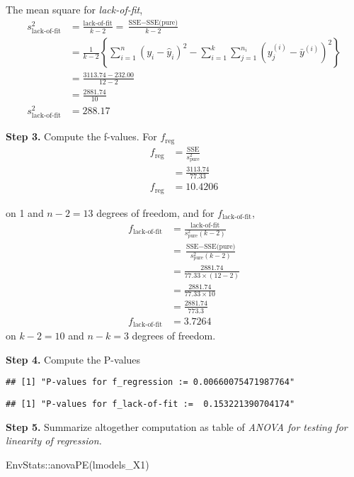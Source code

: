 \documentclass[
]{article}
\newenvironment{Shaded}{\begin{snugshade}}{\end{snugshade}}
\newcommand{\FunctionTok}[1]{\textcolor[rgb]{0.00,0.00,0.00}{#1}}
\newcommand{\NormalTok}[1]{#1}
\newcommand{\SpecialCharTok}[1]{\textcolor[rgb]{0.00,0.00,0.00}{#1}}
\begin{document}
The mean square for \emph{lack-of-fit}, \[
\begin{aligned}
s^2_{\text{lack-of-fit}} &= \frac{\text{lack-of-fit}}{k - 2}
= \frac{\text{SSE} - \text{SSE(pure)}}{k - 2} \\
&= \frac{1}{k - 2} \left\{
\sum_{i = 1}^{n}(y_i - \hat{y}_i)^2 -
\sum_{i = 1}^{k} \sum_{j = 1}^{n_i}(y^{(i)}_j - \bar{y}^{(i)})^2
\right\} \\
&= \frac{3113.74 - 232.00}{12 - 2} \\
&= \frac{2881.74}{10} \\
s^2_{\text{lack-of-fit}} &= 288.17
\end{aligned}
\]

\textbf{Step 3.} Compute the f-values. For \(f_\text{reg}\) \[
\begin{aligned}
f_\text{reg} &= \frac{\text{SSE}}{s^2_\text{pure}} \\
&= \frac{3113.74}{77.33} \\
f_\text{reg} &= 10.4206
\end{aligned}
\]

on 1 and \(n - 2 = 13\) degrees of freedom, and for
\(f_\text{lack-of-fit}\), \[
\begin{aligned}
f_\text{lack-of-fit} &= \frac{\text{lack-of-fit}}{s^2_\text{pure}(k - 2)} \\
&= \frac{\text{SSE} - \text{SSE(pure)}}{s^2_\text{pure}(k - 2)} \\
&= \frac{2881.74}{77.33 \times (12 - 2)} \\
&= \frac{2881.74}{77.33 \times 10} \\
&= \frac{2881.74}{773.3} \\
f_\text{lack-of-fit} &= 3.7264
\end{aligned}
\] on \(k - 2 = 10\) and \(n - k = 3\) degrees of freedom.

\textbf{Step 4.} Compute the P-values

\begin{verbatim}
## [1] "P-values for f_regression := 0.00660075471987764"
\end{verbatim}

\begin{verbatim}
## [1] "P-values for f_lack-of-fit :=  0.153221390704174"
\end{verbatim}

\textbf{Step 5.} Summarize altogether computation as table of
\emph{ANOVA for testing for linearity of regression.}

\begin{Shaded}
\begin{Highlighting}[]
\NormalTok{EnvStats}\SpecialCharTok{::}\FunctionTok{anovaPE}\NormalTok{(lmodels\_X1)}
\end{Highlighting}
\end{Shaded}
\end{document}

